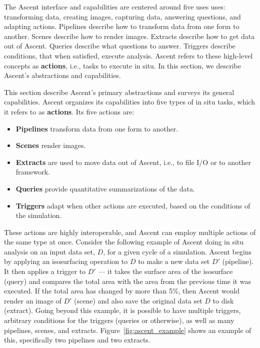 
The Ascent interface and capabilities are centered around five uses uses:
transforming data, creating images, capturing data, answering questions,
and adapting actions.
%
%
Pipelines describe how to transform data from one form to another.
%
Scenes describe how to render images.
%
Extracts describe how to get data out of Ascent.
%
Queries describe what questions to answer.
%
Triggers describe conditions, that when satisfied, execute analysis.
%
Ascent refers to these high-level concepts as \textbf{actions},
i.e., tasks to execute in situ.
In this section, we describe Ascent's abstractions and capabilities.


This section describe Ascent's primary abstractions and surveys its general capabilities.
%
Ascent organizes its capabilities into five types of in situ tasks, which
it refers to as \textbf{actions}.
%
Its five actions are:
\begin{itemize}
\item \textbf{Pipelines} transform data from one form to another.
%
\item \textbf{Scenes} render images.
%
\item \textbf{Extracts} are used to move data out of Ascent, i.e., to file I/O or to another framework.
%
\item \textbf{Queries} provide quantitative summarizations of the data.  
%
\item \textbf{Triggers} adapt when other actions are executed, based on the conditions of the simulation.
%
\end{itemize}

These actions are highly interoperable, and Ascent can employ multiple actions of the same type
at once.
%
Consider the following example of Ascent doing in situ analysis on an input data set, $D$,
for a given cycle of a simulation.
%
Ascent begins by applying an isosurfacing operation to $D$ to make a new data set $D'$ (pipeline).
%
It then applies a trigger to $D'$ --- it takes the surface area of the isosurface (query) and compares
the total area with the area from the previous time it was executed.
%
If the total area has changed by more than 5\%, then Ascent would render an image of $D'$ (scene)
and also save the original data set $D$ to disk (extract).
%
Going beyond this example, it is possible to have multiple triggers, arbitrary conditions for
the triggers (queries or otherwise), as well as many pipelines, scenes, and extracts.
%
Figure~\ref{fig:ascent_example} shows an example of this, specifically two pipelines and two extracts.

